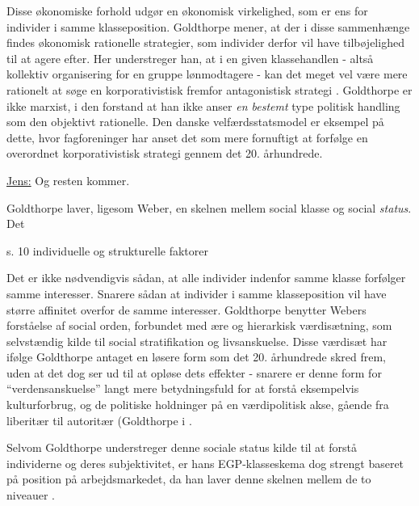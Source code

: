 Disse økonomiske forhold udgør en økonomisk virkelighed, som er ens for individer i samme klasseposition. Goldthorpe mener, at der i disse sammenhænge findes økonomisk rationelle strategier, som individer derfor vil have tilbøjelighed til at agere efter. Her understreger han, at i en given klassehandlen - altså kollektiv organisering for en gruppe lønmodtagere - kan det meget vel være mere rationelt at søge en korporativistisk fremfor antagonistisk strategi \parencite[215]{Goldthorpe2002}. Goldthorpe er ikke marxist, i den forstand at han ikke anser \emph{en bestemt} type politisk handling som den objektivt rationelle. Den danske velfærdsstatsmodel er eksempel på dette, hvor fagforeninger har anset det som mere fornuftigt at forfølge en overordnet korporativistisk strategi gennem det 20. århundrede. %

\underline{Jens:} Og resten kommer.

\iffalse
\label{iffalse}



Goldthorpe laver, ligesom Weber, en skelnen mellem social klasse og social \emph{status}. Det 



s. 10 individuelle og strukturelle faktorer 



Det er ikke nødvendigvis sådan, at alle individer indenfor samme klasse forfølger samme interesser. Snarere sådan at individer i samme klasseposition vil have større affinitet overfor de samme interesser. Goldthorpe benytter Webers forståelse af social orden, forbundet med ære og hierarkisk værdisætning, som selvstændig kilde til social stratifikation og livsanskuelse. Disse værdisæt har ifølge Goldthorpe antaget en løsere form som det 20. århundrede skred frem, uden at det dog ser ud til at opløse dets effekter - snarere er denne form for “verdensanskuelse” langt mere betydningsfuld for at forstå eksempelvis kulturforbrug, og de politiske holdninger på en værdipolitisk akse, gående fra liberitær til autoritær (Goldthorpe i \parencite[95]{Harrits2014}. 

Selvom Goldthorpe understreger denne sociale status kilde til at forstå individerne og deres subjektivitet, er hans EGP-klasseskema dog strengt baseret på position på arbejdsmarkedet, da han laver denne skelnen mellem de to niveauer \parencite[95]{Harrits2014}. 








